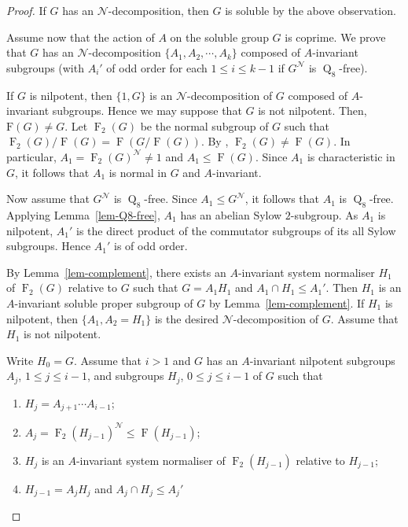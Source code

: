 \documentclass[12pt,a4paper]{article}
\newcommand\F{\mathrm{F}}
\DeclareMathOperator{\Fit}{F}
\DeclareMathOperator{\Q}{Q}
\theoremstyle{definition}
\begin{document}
\begin{proof}
If $G$ has an $\mathcal{N}$-decomposition, then $G$ is soluble by the above observation.

Assume now that the action of $A$ on the soluble group $G$ is coprime. We prove that $G$ has an $\mathcal{N}$-decomposition $\{A_1,A_2,\cdots,A_k\}$ composed of $A$-invariant subgroups (with $A_i'$ of odd order for each $1\leq i \leq k-1$ if $G^{\mathcal{N}}$ is $\Q_8$-free).


If $G$ is nilpotent, then $\{1, G \}$ is an $\mathcal{N}$-decomposition of $G$ composed of $A$-invariant subgroups. Hence we may suppose that
$G$ is not nilpotent. Then, $\F(G) \neq G$. Let $\Fit_2(G)$ be the normal subgroup of $G$ such that $\Fit_2(G)/\Fit(G) = \Fit(G/\Fit(G))$. By \cite[Theorem~A.10.6]{DoerkHawkes1992}, $\Fit_2(G) \neq \Fit(G)$. In particular,  $A_1=\Fit_2(G)^{\mathcal{N}} \neq 1$ and $A_1 \leq \Fit(G)$. Since $A_1$ is characteristic in $G$, it follows that $A_1$ is normal in $G$ and $A$-invariant.

Now  assume that $G^{\mathcal{N}}$ is $\Q_8$-free. Since $A_1 \leq G^{\mathcal{N}}$, it follows that $A_1$ is $\Q_8$-free. Applying Lemma~\ref{lem-Q8-free}, $A_1$ has an abelian Sylow $2$-subgroup. As $A_1$ is nilpotent, $A_{1}'$ is the direct product of the commutator subgroups of its all Sylow subgroups. Hence  $A_{1}'$ is of odd order.


By Lemma~\ref{lem-complement}, there exists an $A$-invariant system normaliser $H_1$ of $\Fit_2(G)$ relative to $G$ such that $G=A_1H_1$ and $A_1 \cap H_1 \leq A_1'$. Then $H_1$ is an $A$-invariant soluble proper subgroup of $G$ by Lemma~\ref{lem-complement}. If $H_1$ is nilpotent, then $\{A_1, A_2 = H_1\}$ is the desired $\mathcal{N}$-decomposition of $G$. Assume that $H_1$ is not nilpotent.

Write $H_0=G$. Assume that $i >1$ and $G$ has an $A$-invariant nilpotent subgroups $A_j$, $1 \leq j \leq i-1$, and subgroups $H_j$,  $0 \leq j \leq i-1$ of $G$ such that

\begin{enumerate}
\item $H_j = A_{j+1} \cdots A_{i-1}$;
\item $A_j=\Fit_2(H_{j-1})^{\mathcal{N}} \leq \Fit(H_{j-1})$;
\item $H_j$ is an $A$-invariant system normaliser of $\Fit_2(H_{j-1})$ relative to $H_{j-1}$;
\item $H_{j-1}=A_jH_j$  and $A_j \cap H_j \leq A_j'$
\end{enumerate}


\end{proof}
\end{document}
